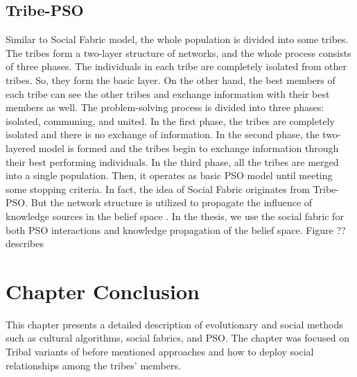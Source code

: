 \subsection{Tribe-PSO}
Similar to Social Fabric model, the whole population is divided into some tribes.  The tribes form a two-layer structure of networks, and the whole process consists of three phases. The individuals in each tribe are completely isolated from other tribes. So, they form the basic layer. On the other hand, the best members of each tribe can see the other tribes and exchange information with their best members as well. The problem-solving process is divided into three phases: isolated, communing, and united. In the first phase, the tribes are completely isolated and there is no exchange of information. In the second phase, the two-layered model is formed and the tribes begin to exchange information through their best performing individuals. In the third phase, all the tribes are merged into a single population. Then, it operates as basic PSO model until meeting some stopping criteria. In fact, the idea of Social Fabric originates from Tribe-PSO. But the network structure is utilized to propagate the influence of knowledge sources in the belief space \cite{chen2006tribe}. In the thesis, we use the social fabric for both PSO interactions and knowledge propagation of the belief space. Figure ?? describes \cdots 

\section{Chapter Conclusion}
This chapter presents a detailed description of evolutionary and social methods such as cultural algorithms, social fabrics, and PSO. The chapter was focused on Tribal variants of before mentioned approaches and how to deploy social relationships among the tribes' members. 







